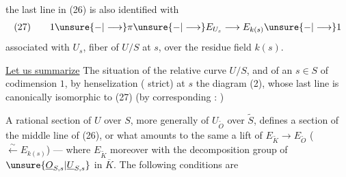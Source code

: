 the last line in (26) is also identified with
\[
(27)\qquad 1\unsure{-|\longrightarrow}\pi\unsure{-|\longrightarrow}E_{U_s}\longrightarrow E_{k(s)}\unsure{-|\longrightarrow}1
\]
associated with $U_s$, fiber of $U/S$ at $s$, over the residue field $k(s)$.

\uline{Let us summarize} The situation of the relative curve $U/S$, and of an $s\in S$ of codimension $1$,  by henselization ( strict) at $s$ the diagram (2), whose last line is canonically isomorphic to (27) (by   corresponding :
)

A rational section  of $U$ over $S$, more generally  of $U_{\widetilde O}$ over $\widetilde S$, defines a section  of the middle line of (26), or what amounts to the same a lift
of $E_{\widetilde K}\longrightarrow E_{\widetilde O}$ ($\xleftarrow{\sim}E_{k(s)}$) --- where $E_{\widetilde K}$  moreover  with the decomposition group of $\unsure{\underline O_{S,s}|\underline U_{S,s}}$ in $\overline K$. The following conditions are
